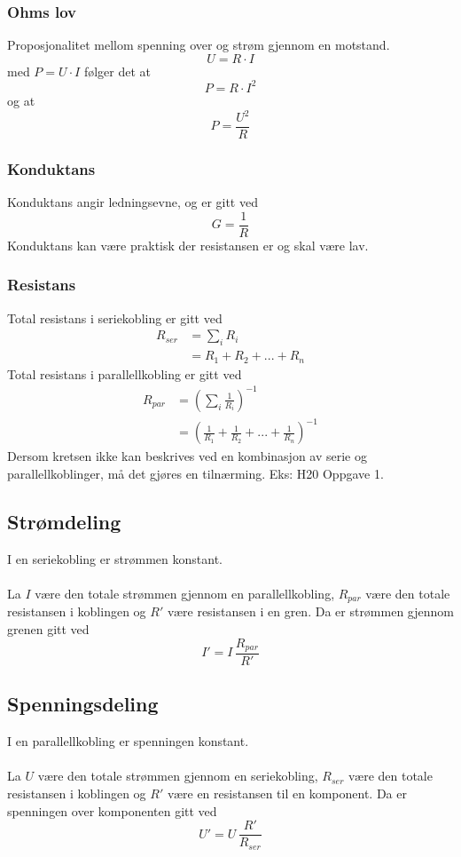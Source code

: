 \documentclass{article}
\begin{document}
\subsubsection{Ohms lov}
Proposjonalitet mellom spenning over og strøm gjennom en motstand.
\[U = R \cdot I\]
med $P = U \cdot I$ følger det at
\[P = R \cdot I^2\]
og at
\[P = \frac{U^2}{R}\]


\subsubsection{Konduktans}
Konduktans angir ledningsevne, og er gitt ved
\[G = \frac{1}{R}\]
Konduktans kan være praktisk der resistansen er og skal være lav.


\subsubsection{Resistans}
Total resistans i seriekobling er gitt ved
\begin{align*}
    R_{ser} &= \sum_i R_i \\
    &= R_1 + R_2 + ... + R_n
\end{align*}
Total resistans i parallellkobling er gitt ved
\begin{align*}
    R_{par} &= \left( \sum_i \frac{1}{R_i} \right)^{-1} \\
    &= \left(\frac{1}{R_1} + \frac{1}{R_2} + ... + \frac{1}{R_n}\right)^{-1}
\end{align*}
Dersom kretsen ikke kan beskrives ved en kombinasjon av serie og parallellkoblinger, må det gjøres en tilnærming. Eks: H20 Oppgave 1.


\subsection{Strømdeling}
I en seriekobling er strømmen konstant.\\\\
La $I$ være den totale strømmen gjennom en parallellkobling, $R_{par}$ være den totale resistansen i koblingen og $R'$ være resistansen i en gren. Da er strømmen gjennom grenen gitt ved
\[I' = I \, \frac{R_{par}}{R'}\]

\subsection{Spenningsdeling}
I en parallellkobling er spenningen konstant.\\\\
La $U$ være den totale strømmen gjennom en seriekobling, $R_{ser}$ være den totale resistansen i koblingen og $R'$ være en resistansen til en komponent. Da er spenningen over komponenten gitt ved
\[U' = U \, \frac{R'}{R_{ser}}\]
\end{document}
